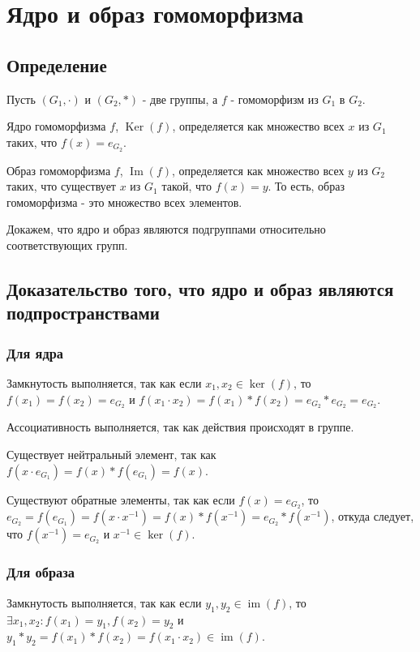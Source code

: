 \documentclass[12pt]{article}
\begin{document}
\section{Ядро и образ гомоморфизма}
\subsection{Определение}
Пусть $(G_1,\cdot)$ и $(G_2,*)$ - две группы, а $f$ - гомоморфизм из $G_1$ в $G_2$.

Ядро гомоморфизма $f$, $\operatorname{Ker}(f)$, определяется как множество всех $x$ из $G_1$ таких, что $f(x)=e_{G_2}$.

Образ гомоморфизма $f$, $\operatorname{Im}(f)$, определяется как множество всех $y$ из $G_2$ таких, что существует $x$ из $G_1$ такой, что $f(x)=y$. То есть, образ гомоморфизма - это множество всех элементов.

Докажем, что ядро и образ являются подгруппами относительно соответствующих групп.

\subsection{Доказательство того, что ядро и образ являются подпространствами}
\subsubsection{Для ядра}

Замкнутость выполняется, так как если $x_1,x_2\in \operatorname{ker}(f)$, то \\ $f(x_1)=f(x_2)=e_{G_2}$ и $f(x_1\cdot x_2)=f(x_1)*f(x_2)=e_{G_2}*e_{G_2}=e_{G_2}$.

Ассоциативность выполняется, так как действия происходят в группе.

Существует нейтральный элемент, так как $f(x\cdot e_{G_1})=f(x)*f(e_{G_1})=f(x)$.

Существуют обратные элементы, так как если $f(x)=e_{G_2}$, то $e_{G_2}=f(e_{G_1})=f(x\cdot x^{-1})=f(x)*f(x^{-1})=e_{G_2}*f(x^{-1})$, откуда следует, что $f(x^{-1})=e_{G_2}$ и $x^{-1}\in \operatorname{ker}(f)$.

\subsubsection{Для образа}

Замкнутость выполняется, так как если $y_1,y_2\in \operatorname{im}(f)$, то \\$\exists x_1,x_2:f(x_1)=y_1,f(x_2)=y_2$ и $y_1*y_2=f(x_1)*f(x_2)=f(x_1\cdot x_2)\in \operatorname{im}(f)$.
\end{document}

